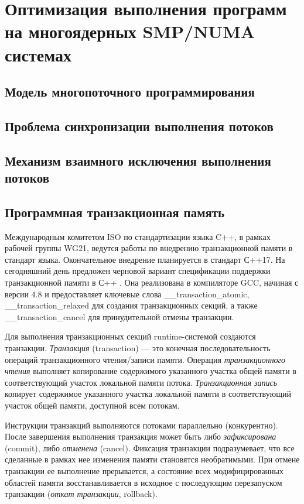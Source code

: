 \chapter{Оптимизация выполнения программ на многоядерных SMP/NUMA системах} \label{part3}
\section{Модель многопоточного программирования}
\section{Проблема синхронизации выполнения потоков}
\section{Механизм взаимного исключения выполнения потоков}
\section{Программная транзакционная память}
Международным комитетом ISO по стандартизации языка C++, в рамках рабочей группы WG21, ведутся работы по внедрению транзакционной памяти в стандарт языка. Окончательное внедрение планируется в стандарт С++17. На сегодняшний день предложен черновой вариант спецификации поддержки транзакционной памяти в С++ \cite{luchango_maurer_moir}. Она реализована в компиляторе GCC, начиная с версии 4.8 и предоставляет ключевые слова \_\_transaction\_atomic, 
\_\_transaction\_relaxed для создания транзакционных секций, а также \_\_transaction\_cancel для принудительной отмены транзакции.

Для выполнения транзакционных секций runtime-системой создаются транзакции. \textit{Транзакция} (transaction) --- это конечная последовательность операций транзакционного чтения/записи памяти. Операция \textit{транзакционного чтения} выполняет копирование содержимого указанного участка общей памяти в соответствующий участок локальной памяти потока. \textit{Транзакционная запись} копирует содержимое указанного участка локальной памяти в соответствующий участок общей памяти, доступной всем потокам.

Инструкции транзакций выполняются потоками параллельно (конкурентно). После завершения выполнения транзакция может быть либо \textit{зафиксирована} (commit), либо \textit{отменена} (cancel). Фиксация транзакции подразумевает, что все сделанные в рамках нее изменения памяти становятся необратимыми. При отмене транзакции ее выполнение прерывается, а состояние всех модифицированных областей памяти восстанавливается в исходное с последующим перезапуском транзакции (\textit{откат транзакции}, rollback).

